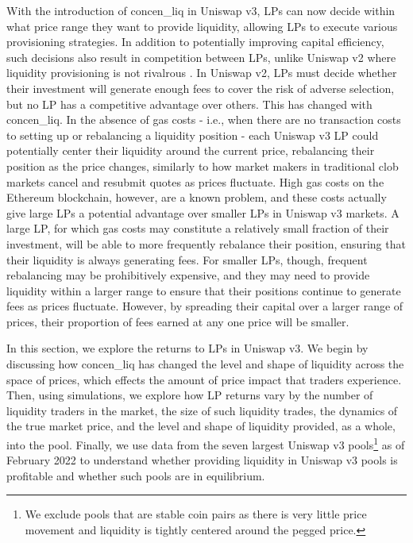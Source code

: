 \documentclass[11pt]{article}
\begin{document}
With the introduction of  \gls{concen_liq} in Uniswap v3, LPs can now decide within what price range they want to provide liquidity, allowing LPs to execute various provisioning strategies. In addition to potentially improving capital efficiency, such decisions also result in competition between LPs, unlike Uniswap v2 where liquidity provisioning is not rivalrous \citep{Lehar2021DecentralizedE}. In Uniswap v2, LPs must decide whether their investment will generate enough fees to cover the risk of adverse selection, but no LP has a competitive advantage over others. This has changed with  \gls{concen_liq}. In the absence of gas costs - i.e., when there are no transaction costs to setting up or rebalancing a liquidity position - each Uniswap v3 LP could potentially center their liquidity around the current price, rebalancing their position as the price changes, similarly to how market makers in traditional \gls{clob} markets cancel and resubmit quotes as prices fluctuate. High gas costs on the Ethereum blockchain, however, are a known problem, and these costs actually give large LPs a potential advantage over smaller LPs in Uniswap v3 markets. A large LP, for which gas costs may constitute a relatively small fraction of their investment, will be able to more frequently rebalance their position, ensuring that their liquidity is always generating fees. For smaller LPs, though, frequent rebalancing may be prohibitively expensive, and they may need to provide liquidity within a larger range to ensure that their positions continue to generate fees as prices fluctuate. However, by spreading their capital over a larger range of prices, their proportion of fees earned at any one price will be smaller.

In this section, we explore the returns to LPs in Uniswap v3. We begin by discussing how  \gls{concen_liq} has changed the level and shape of liquidity across the space of prices, which effects the amount of price impact that traders experience. Then, using simulations, we explore how LP returns vary by the number of liquidity traders in the market, the size of such liquidity trades, the dynamics of the true market price, and the level and shape of liquidity provided, as a whole, into the pool. Finally, we use data from the seven largest Uniswap v3 pools\footnote{We exclude pools that are stable coin pairs as there is very little price movement and liquidity is tightly centered around the pegged price.} as of February 2022 to understand whether providing liquidity in Uniswap v3 pools is profitable and whether such pools are in equilibrium.
\end{document}
